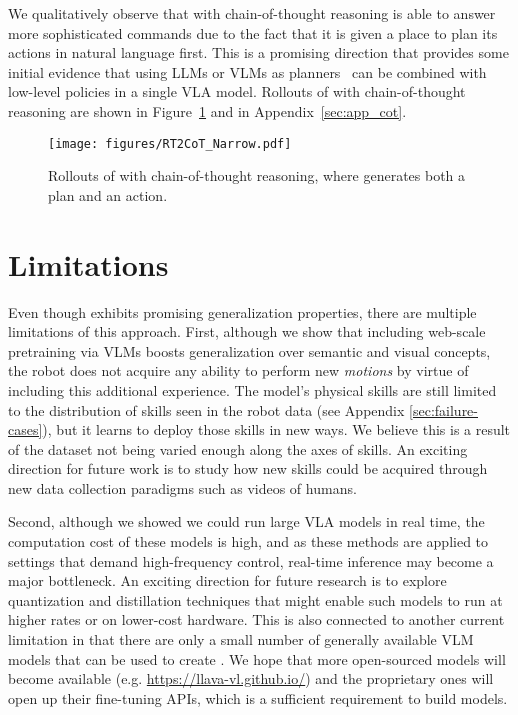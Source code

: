 We qualitatively observe that \methodname with chain-of-thought reasoning is able to answer more sophisticated commands due to the fact that it is given a place to plan its actions in natural language first. This is a promising direction that provides some initial evidence that using LLMs or VLMs as planners~\citep{ahn2022can, driess2023palm} can be combined with low-level policies in a single VLA model.
Rollouts of \methodname with chain-of-thought reasoning are shown in Figure~\ref{fig:cot} and in Appendix~\ref{sec:app_cot}.

\begin{figure}[h]
    \centering
    \texttt{[image: figures/RT2CoT\_Narrow.pdf]}
    \caption{Rollouts of \methodname with chain-of-thought reasoning, where \methodname generates both a plan and an action.}
    \label{fig:cot}
\end{figure}

\section{Limitations}
\label{sec:limitations}
Even though \methodname exhibits promising generalization properties, there are multiple limitations of this approach. First, although we show that including web-scale pretraining via VLMs boosts generalization over semantic and visual concepts, the robot does not acquire any ability to perform new \emph{motions} by virtue of including this additional experience. The model's physical skills are still limited to the distribution of skills seen in the robot data (see Appendix \ref{sec:failure-cases}), but it learns to deploy those skills in new ways. 
We believe this is a result of the dataset not being varied enough along the axes of skills. An exciting direction for future work is to study how new skills could be acquired through new data collection paradigms such as videos of humans.

Second, although we showed we could run large VLA models in real time, the computation cost of these models is high, and as these methods are applied to settings that demand high-frequency control, real-time inference may become a major bottleneck. An exciting direction for future research is to explore quantization and distillation techniques that might enable such models to run at higher rates or on lower-cost hardware. This is also connected to another current limitation in that there are only a small number of generally available VLM models that can be used to create \methodname. We hope that more open-sourced models will become available (e.g. \url{https://llava-vl.github.io/}) and the proprietary ones will open up their fine-tuning APIs, which is a sufficient requirement to build \categoryname models. 

